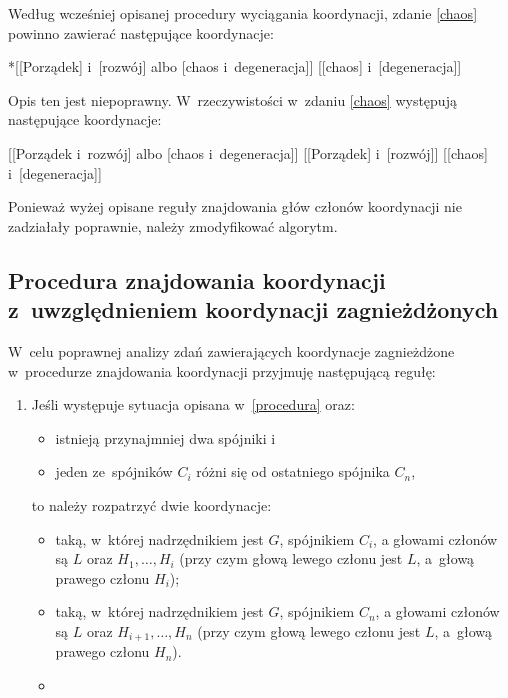 Według wcześniej opisanej procedury wyciągania koordynacji, zdanie \eqref{chaos} powinno zawierać następujące koordynacje:

\begin{exe}
\ex \label{chaos-źle-1}
{*[[Porządek] i~[rozwój] albo [chaos i~degeneracja]]}
\ex \label{chaos-źle-2}
{[[chaos] i~[degeneracja]]}
\end{exe}

Opis ten jest niepoprawny. W~rzeczywistości  w~zdaniu \eqref{chaos} występują następujące koordynacje:

\begin{exe}
\ex \label{chaos-1}
{[[Porządek i~rozwój] albo [chaos i~degeneracja]]}
\ex \label{chaos-2}
{[[Porządek] i~[rozwój]]}
\ex \label{chaos-3}
{[[chaos] i~[degeneracja]]}
\end{exe}

Ponieważ wyżej opisane reguły znajdowania głów członów koordynacji nie zadziałały poprawnie, należy zmodyfikować algorytm.

\subsection{Procedura znajdowania koordynacji z~uwzględnieniem koordynacji zagnieżdżonych} \label{zagnieżdżone}

W~celu poprawnej analizy zdań zawierających koordynacje zagnieżdżone w~procedurze znajdowania koordynacji przyjmuję następującą regułę:

\begin{enumerate}
\item[\namedlabel{H6}{(H6)}] %
Jeśli występuje sytuacja opisana w~\eqref{procedura} oraz:

\begin{itemize}
\item istnieją przynajmniej dwa spójniki i
\item jeden ze~spójników $C_{i}$ różni się od ostatniego spójnika $C_{n}$,
\end{itemize}

to należy rozpatrzyć dwie koordynacje:

\begin{itemize}
\item taką, w~której nadrzędnikiem jest $G$, spójnikiem $C_{i}$, a głowami członów są $L$ oraz $H_{1}, \ldots , H_{i}$ (przy czym głową lewego członu jest $L$, a~głową prawego członu $H_{i}$);
\item taką, w~której nadrzędnikiem jest $G$, spójnikiem $C_{n}$, a głowami członów są $L$ oraz $H_{i+1}, \ldots , H_{n}$ (przy czym głową lewego członu jest $L$, a~głową prawego członu $H_{n}$).
\item
\end{itemize} 
\end{enumerate}

